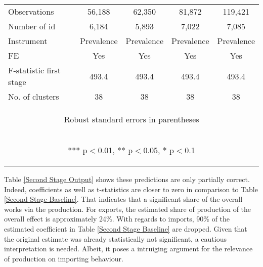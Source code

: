 \documentclass{article}
\begin{document}
\begin{table}[htbp]
{\begin{tabular}{lcccc}
Observations & 56,188 & 62,350 & 81,872 & 119,421 \\
Number of id & 6,184 & 5,893 & 7,022 & 7,085 \\
Instrument & Prevalence & Prevalence & Prevalence & Prevalence \\
FE & Yes & Yes & Yes & Yes \\
F-statistic first stage & 493.4 & 493.4 & 493.4 & 493.4 \\
 No. of clusters & 38 & 38 & 38 & 38 \\ \hline
\multicolumn{5}{c}{\begin{footnotesize} Robust standard errors in parentheses\end{footnotesize}} \\
\multicolumn{5}{c}{\begin{footnotesize} *** p$<$0.01, ** p$<$0.05, * p$<$0.1\end{footnotesize}} \\
\end{tabular}
}
\end{table}
Table \ref{Second Stage Output} shows these predictions are only partially correct. Indeed, coefficients as well as t-statistics are closer to zero in comparison to Table \ref{Second Stage Baseline}. That indicates that a significant share of the overall works via the production. For exports, the estimated share of production of the overall effect is approximately 24\%. With regards to imports, 90\% of the estimated coefficient in Table \ref{Second Stage Baseline} are dropped. Given that the original estimate was already statistically not significant, a cautious interpretation is needed. Albeit, it poses a intruiging argument for the relevance of production on importing behaviour. 
\end{document}
